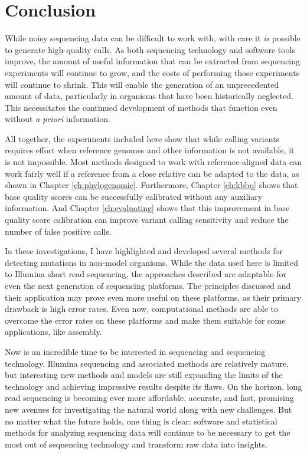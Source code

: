 \chapter{Conclusion}

While noisy sequencing data can be difficult to work with, with care it \textit{is} possible to generate high-quality calls. As both sequencing technology and software tools improve, the amount of useful information that can be extracted from sequencing experiments will continue to grow, and the costs of performing those experiments will continue to shrink. This will enable the generation of an unprecedented amount of data, particularly in organisms that have been historically neglected. This necessitates the continued development of methods that function even without \textit{a priori} information.

All together, the experiments included here show that while calling variants requires effort when reference genomes and other information is not available, it is not impossible. Most methods designed to work with reference-aligned data can work fairly well if a reference from a close relative can be adapted to the data, as shown in Chapter \ref{ch:phylogenomic}. Furthermore, Chapter \ref{ch:kbbq} shows that base quality scores can be successfully calibrated without any auxiliary information. And Chapter \ref{ch:evaluating} shows that this improvement in base quality score calibration can improve variant calling sensitivity and reduce the number of false positive calls.

In these investigations, I have highlighted and developed several methods for detecting mutations in non-model organisms. While the data used here is limited to Illumina short read sequencing, the approaches described are adaptable for even the next generation of sequencing platforms. The principles discussed and their application may prove even more useful on these platforms, as their primary drawback is high error rates. Even now, computational methods are able to overcome the error rates on these platforms and make them suitable for some applications, like assembly.

Now is an incredible time to be interested in sequencing and sequencing technology. Illumina sequencing and associated methods are relatively mature, but interesting new methods and models are still expanding the limits of the technology and achieving impressive results despite its flaws. On the horizon, long read sequencing is becoming ever more affordable, accurate, and fast, promising new avenues for investigating the natural world along with new challenges. But no matter what the future holds, one thing is clear: software and statistical methods for analyzing sequencing data will continue to be necessary to get the most out of sequencing technology and transform raw data into insights.



